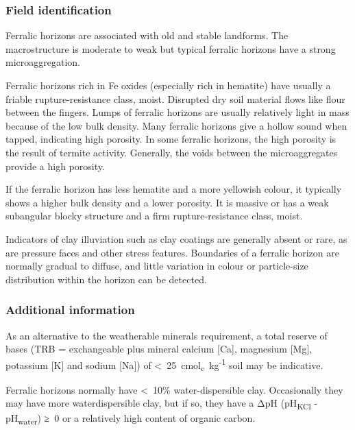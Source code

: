 \documentclass[
  letterpaper,
  DIV=11,
  numbers=noendperiod]{scrreprt}
\begin{document}
\hypertarget{field-identification-7}{%
\subsubsection{Field identification}\label{field-identification-7}}

Ferralic horizons are associated with old and stable landforms. The
macrostructure is moderate to weak but typical ferralic horizons have a
strong microaggregation.

Ferralic horizons rich in Fe oxides (especially rich in hematite) have
usually a friable rupture-resistance class, moist. Disrupted dry soil
material flows like flour between the fingers. Lumps of ferralic
horizons are usually relatively light in mass because of the low bulk
density. Many ferralic horizons give a hollow sound when tapped,
indicating high porosity. In some ferralic horizons, the high porosity
is the result of termite activity. Generally, the voids between the
microaggregates provide a high porosity.

If the ferralic horizon has less hematite and a more yellowish colour,
it typically shows a higher bulk density and a lower porosity. It is
massive or has a weak subangular blocky structure and a firm
rupture-resistance class, moist.

Indicators of clay illuviation such as clay coatings are generally
absent or rare, as are pressure faces and other stress features.
Boundaries of a ferralic horizon are normally gradual to diffuse, and
little variation in colour or particle-size distribution within the
horizon can be detected.

\hypertarget{additional-information-6}{%
\subsubsection{Additional information}\label{additional-information-6}}

As an alternative to the weatherable minerals requirement, a total
reserve of bases (TRB = exchangeable plus mineral calcium {[}Ca{]},
magnesium {[}Mg{]}, potassium {[}K{]} and sodium {[}Na{]}) of
\textless~25~cmol\textsubscript{c}~kg\textsuperscript{-1} soil may be
indicative.

Ferralic horizons normally have \textless~10\% water-dispersible clay.
Occasionally they may have more waterdispersible clay, but if so, they
have a ΔpH (pH\textsubscript{KCl} - pH\textsubscript{water}) ≥~0 or a
relatively high content of organic carbon.
\end{document}

